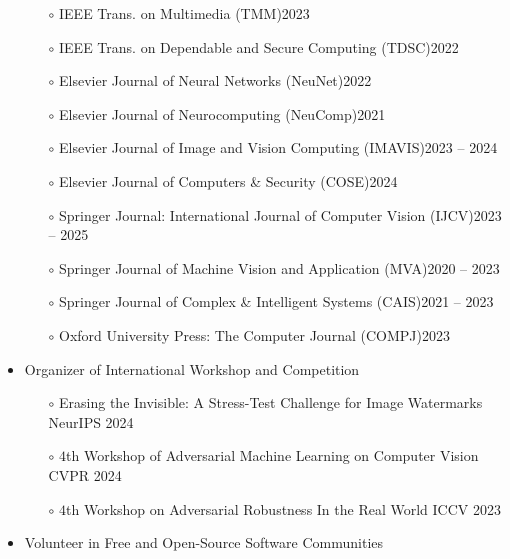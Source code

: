 \documentclass[10pt,margin,line,pifont,palatino,courier]{res}
\begin{document}
\begin{resume}
\begin{itemize}[leftmargin=*]
\begin{itemize}[noitemsep, leftmargin=*]
        \item[$\circ$] IEEE Trans. on Multimedia (TMM)\hfill 2023
        \item[$\circ$] IEEE Trans. on Dependable and Secure Computing (TDSC)\hfill 2022
        \item[$\circ$] Elsevier Journal of Neural Networks (NeuNet)\hfill 2022
        \item[$\circ$] Elsevier Journal of Neurocomputing (NeuComp)\hfill 2021
        \item[$\circ$] Elsevier Journal of Image and Vision Computing (IMAVIS)\hfill 2023 -- 2024
        \item[$\circ$] Elsevier Journal of Computers \& Security (COSE)\hfill 2024
        \item[$\circ$] Springer Journal: International Journal of Computer Vision (IJCV)\hfill 2023 -- 2025
        \item[$\circ$] Springer Journal of Machine Vision and Application (MVA)\hfill 2020 -- 2023
        \item[$\circ$] Springer Journal of Complex \& Intelligent Systems (CAIS)\hfill 2021 -- 2023
        \item[$\circ$] Oxford University Press: The Computer Journal (COMPJ)\hfill 2023
    \end{itemize}
\item Organizer of International Workshop and Competition
    \begin{itemize}[noitemsep, leftmargin=*]
        \item[$\circ$] Erasing the Invisible: A Stress-Test Challenge for Image Watermarks \hfill NeurIPS 2024
\reversemarginpar{}
        \item[$\circ$] $4$th Workshop of Adversarial Machine Learning on Computer Vision \hfill CVPR 2024
\reversemarginpar{}
        \item[$\circ$] $4$th Workshop on Adversarial Robustness In the Real World \hfill ICCV  2023
\reversemarginpar{}
    \end{itemize}
\item Volunteer in Free and Open-Source Software Communities
    \begin{itemize}[noitemsep, leftmargin=*]

\end{itemize}
\end{itemize}
\end{resume}
\end{document}
